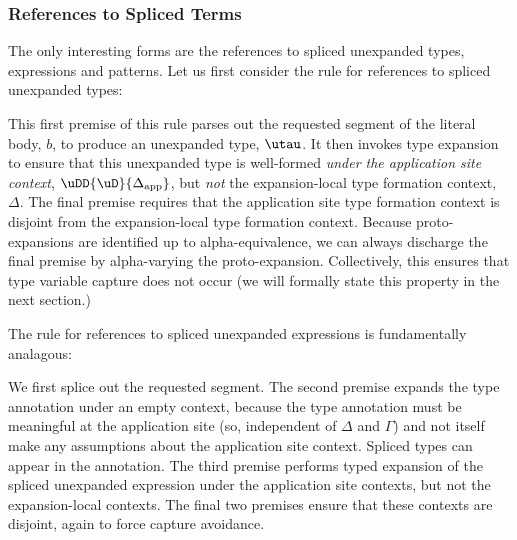 \documentclass[acmsmall,10pt,review,anonymous]{acmart}\settopmatter{printfolios=true}
\begin{document}
\subsubsection{References to Spliced Terms} The only interesting forms are the references to spliced unexpanded types, expressions and patterns. Let us first consider the rule for references to spliced unexpanded types:
\begin{mathpar}
\end{mathpar}
This first premise of this rule parses out the requested segment of the literal body, $b$, to produce an unexpanded type, $\utau$. It then invokes type expansion to ensure that this unexpanded type is well-formed \emph{under the application site context}, $\uDD{\uD}{\Delta_\text{app}}$, but \emph{not} the expansion-local type formation context, $\Delta$.  The final premise requires that the application site type formation context is disjoint from the expansion-local type formation context. Because proto-expansions are identified up to alpha-equivalence, we can always discharge the final premise by alpha-varying the proto-expansion. Collectively, this ensures that type variable capture does not occur (we will formally state this property in the next section.) 

The rule for references to spliced unexpanded expressions is fundamentally analagous:
\begin{mathpar}
\end{mathpar}
We first splice out the requested segment. The second premise expands the type annotation under an empty context, because the type annotation must be meaningful at the application site (so, independent of $\Delta$ and $\Gamma$) and not itself make any assumptions about the application site context. Spliced types can appear in the annotation. The third premise performs typed expansion of the spliced unexpanded expression under the application site contexts, but not the expansion-local contexts. The final two premises ensure that these contexts are disjoint, again to force capture avoidance.
\end{document}
